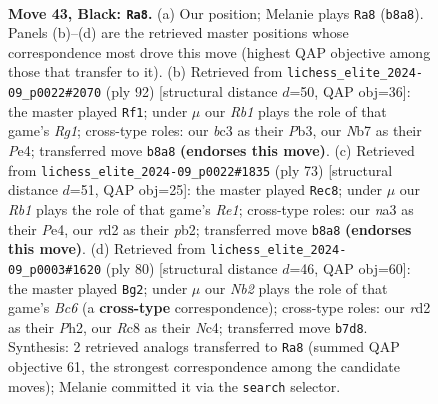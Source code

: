 \documentclass[11pt]{article}
\begin{document}
\clearpage

\begin{figure}[p]\centering
\begin{subfigure}{0.46\textwidth}\centering
\resizebox{\linewidth}{!}{%
\newchessgame
\chessboard[
  setfen={1rr5/pn6/1p2p1kp/5p2/2P4R/N1B1P3/P2R1PP1/5K2 b - - 1 43},
  showmover=false,
  pgfstyle=straightmove, color=movearrow, markmove={b8-a8}
]}
\caption{}
\end{subfigure}\hfill
\begin{subfigure}{0.46\textwidth}\centering
\resizebox{\linewidth}{!}{%
\newchessgame
\chessboard[
  setfen={8/4rpr1/p2Np2k/P1p1n1pP/4P3/1PP5/2K3R1/6R1 w - - 4 47},
  showmover=false,
  pgfstyle=straightmove, color=movearrow, markmove={g1-f1}
]}
\caption{}
\end{subfigure}
\\[4pt]
\begin{subfigure}{0.46\textwidth}\centering
\resizebox{\linewidth}{!}{%
\newchessgame
\chessboard[
  setfen={r3r3/PRp2k2/2P3p1/5p1p/4p2P/8/1P3PP1/R5K1 b - - 2 37},
  showmover=false,
  pgfstyle=straightmove, color=movearrow, markmove={e8-c8}
]}
\caption{}
\end{subfigure}\hfill
\begin{subfigure}{0.46\textwidth}\centering
\resizebox{\linewidth}{!}{%
\newchessgame
\chessboard[
  setfen={1bnr4/4r3/1PB3pk/4pp2/2Np4/3P2P1/7P/1R2R1K1 w - - 3 41},
  showmover=false,
  pgfstyle=straightmove, color=movearrow, markmove={c6-g2}
]}
\caption{}
\end{subfigure}
\caption{\textbf{Move 43, Black: \texttt{Ra8}.} (a) Our position; Melanie plays \texttt{Ra8} (\texttt{b8a8}). Panels (b)--(d) are the retrieved master positions whose correspondence most drove this move (highest QAP objective among those that transfer to it). (b) Retrieved from \texttt{lichess\_elite\_2024-09\_p0022\#2070} (ply 92) [structural distance $d$=50, QAP obj=36]: the master played \texttt{Rf1}; under $\mu$ our \emph{Rb1} plays the role of that game's \emph{Rg1}; cross-type roles: our \emph{b}c3 as their \emph{P}b3, our \emph{N}b7 as their \emph{P}e4; transferred move \texttt{b8a8} \textbf{(endorses this move)}. (c) Retrieved from \texttt{lichess\_elite\_2024-09\_p0022\#1835} (ply 73) [structural distance $d$=51, QAP obj=25]: the master played \texttt{Rec8}; under $\mu$ our \emph{Rb1} plays the role of that game's \emph{Re1}; cross-type roles: our \emph{n}a3 as their \emph{P}e4, our \emph{r}d2 as their \emph{p}b2; transferred move \texttt{b8a8} \textbf{(endorses this move)}. (d) Retrieved from \texttt{lichess\_elite\_2024-09\_p0003\#1620} (ply 80) [structural distance $d$=46, QAP obj=60]: the master played \texttt{Bg2}; under $\mu$ our \emph{Nb2} plays the role of that game's \emph{Bc6} (a \textbf{cross-type} correspondence); cross-type roles: our \emph{r}d2 as their \emph{P}h2, our \emph{R}c8 as their \emph{N}c4; transferred move \texttt{b7d8}. Synthesis: 2 retrieved analogs transferred to \texttt{Ra8} (summed QAP objective 61, the strongest correspondence among the candidate moves); Melanie committed it via the \texttt{search} selector.}
\label{fig:thought-m85}
\end{figure}
\end{document}
